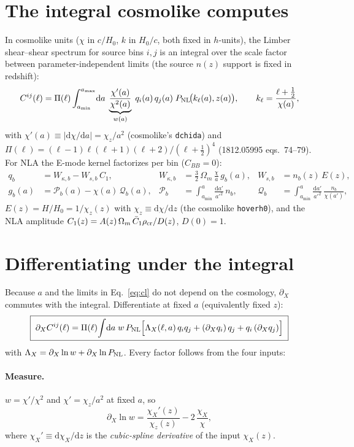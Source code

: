 \documentclass[11pt]{article}
\newcommand{\dd}{\mathrm{d}}
\newcommand{\pX}{\partial_X}
\begin{document}
\section{The integral cosmolike computes}
In cosmolike units ($\chi$ in $c/H_0$, $k$ in $H_0/c$, both fixed in $h$-units),
the Limber shear--shear spectrum for source bins $i,j$ is an integral over the
scale factor between parameter-independent limits (the source $n(z)$ support is
fixed in redshift):
\begin{equation}
C^{ij}(\ell)=\Pi(\ell)\int_{a_{\min}}^{a_{\max}}\!\dd a\;
\underbrace{\frac{\chi'(a)}{\chi^2(a)}}_{w(a)}\;
q_i(a)\,q_j(a)\;P_{\rm NL}\!\big(k_\ell(a),z(a)\big),
\qquad k_\ell=\frac{\ell+\tfrac12}{\chi(a)},
\label{eq:cl}
\end{equation}
with $\chi'(a)\equiv|\dd\chi/\dd a|=\chi_z/a^2$ (cosmolike's \texttt{dchida}) and
$\Pi(\ell)=(\ell-1)\ell(\ell+1)(\ell+2)/(\ell+\tfrac12)^4$ (1812.05995 eqs.~74--79).
For NLA the E-mode kernel factorizes per bin ($C_{BB}=0$):
\begin{align}
q_b &= W_{\kappa,b}-W_{s,b}\,C_1, &
W_{\kappa,b}&=\tfrac32\,\Omega_m\,\frac{\chi}{a}\,g_b(a), &
W_{s,b}&=n_b(z)\,E(z),\\
g_b(a)&=\mathcal P_b(a)-\chi(a)\,\mathcal Q_b(a), &
\mathcal P_b&=\!\int_{a_{\min}}^{a}\!\!\frac{\dd a'}{a'^2}\,n_b, &
\mathcal Q_b&=\!\int_{a_{\min}}^{a}\!\!\frac{\dd a'}{a'^2}\,\frac{n_b}{\chi(a')},
\end{align}
$E(z)=H/H_0=1/\chi_z(z)$ with $\chi_z\equiv\dd\chi/\dd z$ (the cosmolike
\texttt{hoverh0}), and the NLA amplitude
$C_1(z)=A(z)\,\Omega_m\,\bar C_1\rho_{\rm cr}/D(z)$, $D(0)=1$.

\section{Differentiating under the integral}
Because $a$ and the limits in Eq.~\eqref{eq:cl} do not depend on the
cosmology, $\partial_X$ commutes with the integral. Differentiate at fixed $a$
(equivalently fixed $z$):
\begin{equation}
\boxed{\;
\pX C^{ij}(\ell)=\Pi(\ell)\!\int\!\dd a\;w\,P_{\rm NL}
\Big[\Lambda_X(\ell,a)\,q_iq_j+(\pX q_i)\,q_j+q_i\,(\pX q_j)\Big]\;}
\label{eq:master}
\end{equation}
with $\Lambda_X=\pX\ln w+\pX\ln P_{\rm NL}$. Every factor follows from the
four inputs:

\paragraph{Measure.} $w=\chi'/\chi^2$ and $\chi'=\chi_z/a^2$ at fixed $a$, so
\begin{equation}
\pX\ln w=\frac{\chi_X'(z)}{\chi_z(z)}-2\,\frac{\chi_X}{\chi},
\end{equation}
where $\chi_X'\equiv\dd\chi_X/\dd z$ is the \emph{cubic-spline derivative}
of the input $\chi_X(z)$.
\end{document}
